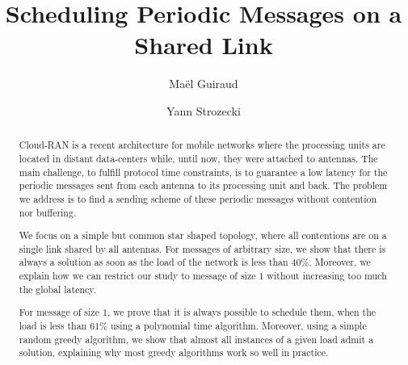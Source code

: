 \documentclass[a4paper,UKenglish,cleveref, autoref, thm-restate]{lipics-v2019}
\title{Scheduling Periodic Messages on a Shared Link} %
\author{Ma\"el Guiraud}{David Laboratory, UVSQ, France \and Nokia Bell Labs, France}{mael.guiraud@uvsq.fr}{}{}%
\author{Yann Strozecki}{David Laboratory, UVSQ, France \and \url{https://yann-strozecki.github.io/}}{yann.strozecki@uvsq.fr}{}{}
\begin{document}
\maketitle








\begin{abstract}
Cloud-RAN is a recent architecture for mobile networks where the processing units are located in distant data-centers while, until now, they were attached to antennas. The main challenge, to fulfill protocol time constraints, is to guarantee a low latency for the periodic messages sent from each antenna to its processing unit and back. The problem we address is to find a sending scheme of these periodic messages without contention nor buffering.

We focus on a simple but common star shaped topology, where all contentions are on a single link shared by all antennas. For messages of arbitrary size, we show that there is always a solution as soon as the load of the network is less than $40\%$. Moreover, we explain how we can restrict our study to message of size $1$ without increasing too much the global latency. 

For message of size $1$, we prove that it is always possible to schedule them, when the load is less than $61\%$  using a polynomial time algorithm. Moreover, using a simple random greedy algorithm, we show that almost all instances of a given load admit a solution, explaining why most greedy algorithms work so well in practice.  
\end{abstract}
\end{document}
